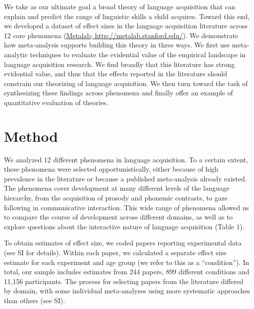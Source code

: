 \documentclass[english,floatsintext,man]{apa6}
\begin{document}
We take as our ultimate goal a broad theory of language acquisition that
can explain and predict the range of linguistic skills a child acquires.
Toward this end, we developed a dataset of effect sizes in the language
acquisition literature across 12 core phenomena
(\href{http://metalab.stanford.edu}{Metalab;
http://metalab.stanford.edu/}). We demonstrate how meta-analysis
supports building this theory in three ways. We first use meta-analytic
techniques to evaluate the evidential value of the empirical landscape
in language acquisition research. We find broadly that this literature
has strong evidential value, and thus that the effects reported in the
literature should constrain our theorizing of language acquisition. We
then turn toward the task of synthesizing these findings across
phenomena and finally offer an example of quantitative evaluation of
theories.

\section{Method}\label{method}

We analyzed 12 different phenomena in language acquisition. To a certain
extent, these phenomena were selected opportunistically, either because
of high prevalence in the literature or because a published
meta-analysis already existed. The phenomena cover development at many
different levels of the language hierarchy, from the acquisition of
prosody and phonemic contrasts, to gaze following in communicative
interaction. This wide range of phenomena allowed us to compare the
course of development across different domains, as well as to explore
questions about the interactive nature of language acquisition (Table
1).

To obtain estimates of effect size, we coded papers reporting
experimental data (see SI for details). Within each paper, we calculated
a separate effect size estimate for each experiment and age group (we
refer to this as a \enquote{condition}). In total, our sample includes
estimates from 244 papers, 899 different conditions and 11,156
participants. The process for selecting papers from the literature
differed by domain, with some individual meta-analyses using more
systematic approaches than others (see SI).
\renewcommand{\arraystretch}{1.5}
\end{document}
